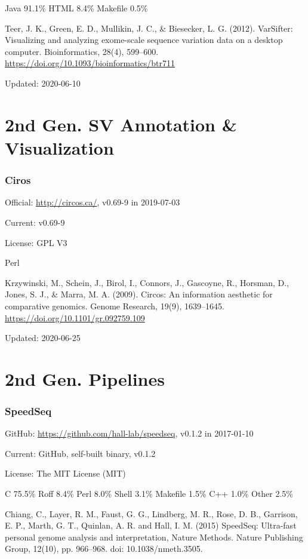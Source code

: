 \documentclass[]{article}
\begin{document}
Java 91.1\% HTML 8.4\% Makefile 0.5\%

Teer, J. K., Green, E. D., Mullikin, J. C., \& Biesecker, L. G. (2012). VarSifter: Visualizing and analyzing exome-scale sequence variation data on a desktop computer. Bioinformatics, 28(4), 599–600. \url{https://doi.org/10.1093/bioinformatics/btr711}

Updated: 2020-06-10

\part{2nd Gen. SV Annotation \& Visualization}

\section{Ciros}

Official: \url{http://circos.ca/}, v0.69-9  in 2019-07-03

Current: v0.69-9

License: GPL V3

Perl

Krzywinski, M., Schein, J., Birol, I., Connors, J., Gascoyne, R., Horsman, D., Jones, S. J., \& Marra, M. A. (2009). Circos: An information aesthetic for comparative genomics. Genome Research, 19(9), 1639–1645. \url{https://doi.org/10.1101/gr.092759.109 }

Updated: 2020-06-25

\part{2nd Gen. Pipelines}
\section{SpeedSeq}

GitHub: \url{https://github.com/hall-lab/speedseq}, v0.1.2 in 2017-01-10

Current: GitHub, self-built binary, v0.1.2

License: The MIT License (MIT)

C 75.5\% Roff 8.4\% Perl 8.0\% Shell 3.1\% Makefile 1.5\% C++ 1.0\% Other 2.5\%

Chiang, C., Layer, R. M., Faust, G. G., Lindberg, M. R., Rose, D. B., Garrison, E. P., Marth, G. T., Quinlan, A. R. and Hall, I. M. (2015) SpeedSeq: Ultra-fast personal genome analysis and interpretation, Nature Methods. Nature Publishing Group, 12(10), pp. 966–968. doi: 10.1038/nmeth.3505.
\end{document}
